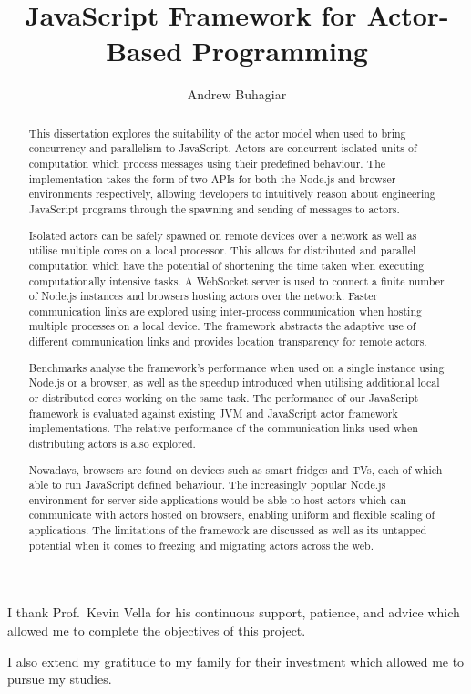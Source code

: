 \documentclass[oneside]{um-fict}
\title{JavaScript Framework for Actor-Based Programming}  %
\author{Andrew Buhagiar}            %
\begin{document}
\frontmatter 
\maketitle
\begin{acknowledgements}
I thank Prof.\ Kevin Vella for his continuous support, patience, and advice which allowed me to complete the objectives of this project.

I also extend my gratitude to my family for their investment which allowed me to pursue my studies.
\end{acknowledgements}   %
\begin{abstract}
This dissertation explores the suitability of the actor model when used to bring concurrency and parallelism to JavaScript. Actors are concurrent isolated units of computation which process messages using their predefined behaviour. The implementation takes the form of two APIs for both the Node.js and browser environments respectively, allowing developers to intuitively reason about engineering JavaScript programs through the spawning and sending of messages to actors.

Isolated actors can be safely spawned on remote devices over a network as well as utilise multiple cores on a local processor. This allows for distributed and parallel computation which have the potential of shortening the time taken when executing computationally intensive tasks. A WebSocket server is used to connect a finite number of Node.js instances and browsers hosting actors over the network. Faster communication links are explored using inter-process communication when hosting multiple processes on a local device. The framework abstracts the adaptive use of different communication links and provides location transparency for remote actors.

Benchmarks analyse the framework's performance when used on a single instance using Node.js or a browser, as well as the speedup introduced when utilising additional local or distributed cores working on the same task. The performance of our JavaScript framework is evaluated against existing JVM and JavaScript actor framework implementations. The relative performance of the communication links used when distributing actors is also explored.

Nowadays, browsers are found on devices such as smart fridges and TVs, each of which able to run JavaScript defined behaviour. The increasingly popular Node.js environment for server-side applications would be able to host actors which can communicate with actors hosted on browsers, enabling uniform and flexible scaling of applications. The limitations of the framework are discussed as well as its untapped potential when it comes to freezing and migrating actors across the web.
\end{abstract}\if@openright\cleardoublepage\else\clearpage\fi
\tableofcontents*\if@openright\cleardoublepage\else\clearpage\fi
\listoffigures*\if@openright\cleardoublepage\else\clearpage
\listoftables*\if@openright\cleardoublepage\else\clearpage\fi
\end{document}
